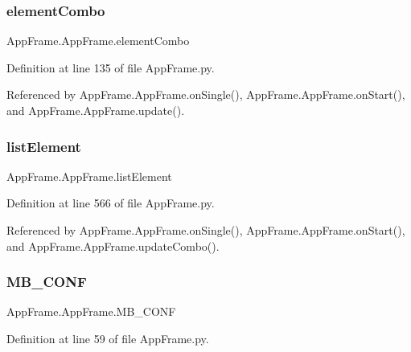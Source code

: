 \subsubsection{\texorpdfstring{element\+Combo}{elementCombo}}
{\footnotesize\ttfamily App\+Frame.\+App\+Frame.\+element\+Combo}



Definition at line 135 of file App\+Frame.\+py.



Referenced by App\+Frame.\+App\+Frame.\+on\+Single(), App\+Frame.\+App\+Frame.\+on\+Start(), and App\+Frame.\+App\+Frame.\+update().

\mbox{\label{classAppFrame_1_1AppFrame_a801af487e291612b9d9022a24740a830}} 
\subsubsection{\texorpdfstring{list\+Element}{listElement}}
{\footnotesize\ttfamily App\+Frame.\+App\+Frame.\+list\+Element}



Definition at line 566 of file App\+Frame.\+py.



Referenced by App\+Frame.\+App\+Frame.\+on\+Single(), App\+Frame.\+App\+Frame.\+on\+Start(), and App\+Frame.\+App\+Frame.\+update\+Combo().

\mbox{\label{classAppFrame_1_1AppFrame_ae581d904da03cef2bc16257939c5b62f}} 
\subsubsection{\texorpdfstring{M\+B\+\_\+\+C\+O\+NF}{MB\_CONF}}
{\footnotesize\ttfamily App\+Frame.\+App\+Frame.\+M\+B\+\_\+\+C\+O\+NF}



Definition at line 59 of file App\+Frame.\+py.

\mbox{\label{classAppFrame_1_1AppFrame_a09162921642354e6160421293064e44e}} 

